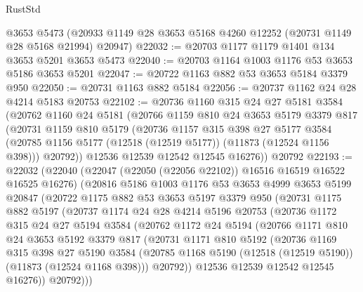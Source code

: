 \begin{lexlean}{RustStd}
\begin{coremodule}
    @3653
    @5473
    (@20933 @1149 @28 @3653 @5168 @4260 @12252 (@20731 @1149 @28 @5168 @21994) @20947)
@22032 := @20703 @1177 @1179 @1401 @134 @3653 @5201 @3653 @5473
@22040 := @20703 @1164 @1003 @1176 @53 @3653 @5186 @3653 @5201
@22047 := @20722 @1163 @882 @53 @3653 @5184 @3379 @950
@22050 := @20731 @1163 @882 @5184
@22056 := @20737 @1162 @24 @28 @4214 @5183 @20753
@22102 := @20736
    @1160
    @315
    @24
    @27
    @5181
    @3584
    (@20762
      @1160
      @24
      @5181
      (@20766
        @1159
        @810
        @24
        @3653
        @5179
        @3379
        @817
        (@20731
          @1159
          @810
          @5179
          (@20736
            @1157
            @315
            @398
            @27
            @5177
            @3584
            (@20785 @1156 @5177 (@12518 (@12519 @5177)) (@11873 (@12524 @1156 @398)))
            @20792))
        @12536
        @12539
        @12542
        @12545
        @16276))
    @20792
@22193 := @22032
    (@22040
      (@22047 (@22050 (@22056 @22102)) @16516 @16519 @16522 @16525 @16276)
      (@20816
        @5186
        @1003
        @1176
        @53
        @3653
        @4999
        @3653
        @5199
        @20847
        (@20722
          @1175
          @882
          @53
          @3653
          @5197
          @3379
          @950
          (@20731
            @1175
            @882
            @5197
            (@20737
              @1174
              @24
              @28
              @4214
              @5196
              @20753
              (@20736
                @1172
                @315
                @24
                @27
                @5194
                @3584
                (@20762
                  @1172
                  @24
                  @5194
                  (@20766
                    @1171
                    @810
                    @24
                    @3653
                    @5192
                    @3379
                    @817
                    (@20731
                      @1171
                      @810
                      @5192
                      (@20736
                        @1169
                        @315
                        @398
                        @27
                        @5190
                        @3584
                        (@20785 @1168 @5190 (@12518 (@12519 @5190)) (@11873 (@12524 @1168 @398)))
                        @20792))
                    @12536
                    @12539
                    @12542
                    @12545
                    @16276))
                @20792)))

\end{coremodule}
\end{lexlean}
